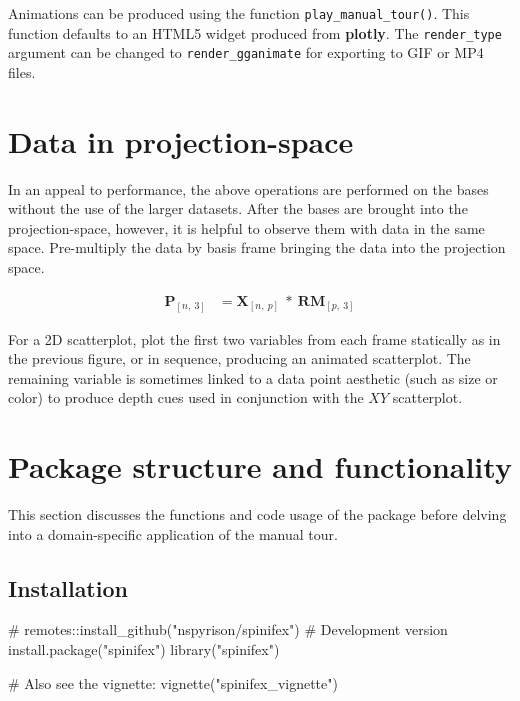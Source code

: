 Animations can be produced using the function
\texttt{play\_manual\_tour()}. This function defaults to an HTML5 widget
produced from \textbf{plotly}. The \texttt{render\_type} argument can be
changed to \texttt{render\_gganimate} for exporting to GIF or MP4 files.

\hypertarget{sec:display}{%
\section{Data in projection-space}\label{sec:display}}

In an appeal to performance, the above operations are performed on the
bases without the use of the larger datasets. After the bases are
brought into the projection-space, however, it is helpful to observe
them with data in the same space. Pre-multiply the data by basis frame
bringing the data into the projection space.

\begin{align*}
  \textbf{P}_{[n,~3]} &= \textbf{X}_{[n,~p]} ~*~ \textbf{RM}_{[p,~3]}
\end{align*}

For a 2D scatterplot, plot the first two variables from each frame
statically as in the previous figure, or in sequence, producing an
animated scatterplot. The remaining variable is sometimes linked to a
data point aesthetic (such as size or color) to produce depth cues used
in conjunction with the \(XY\) scatterplot.

\hypertarget{sec:usage}{%
\section{Package structure and functionality}\label{sec:usage}}

This section discusses the functions and code usage of the package
before delving into a domain-specific application of the manual tour.

\hypertarget{installation}{%
\subsection{Installation}\label{installation}}

\begin{Schunk}
\begin{Sinput}
# remotes::install_github("nspyrison/spinifex") # Development version
install.package("spinifex")
library("spinifex")

# Also see the vignette: 
vignette("spinifex_vignette")
\end{Sinput}
\end{Schunk}

